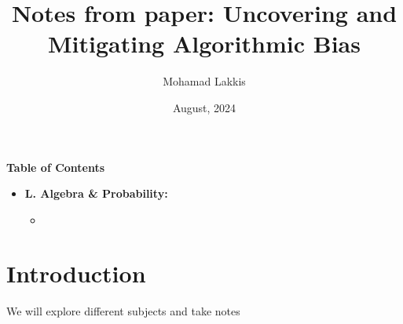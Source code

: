 \documentclass{article}
\title{Notes from paper: Uncovering and Mitigating Algorithmic Bias}
\author{Mohamad Lakkis}
\date{August, 2024}
\begin{document}
\maketitle
\begin{center}
  \textbf{\Large Table of Contents}
\end{center}

\begin{itemize}
  \item \textbf{L. Algebra \& Probability:}
  \begin{itemize}
      \item 
      
  \end{itemize}
\end{itemize}

\newpage




\section{Introduction}
We will explore different subjects and take notes
\end{document}
